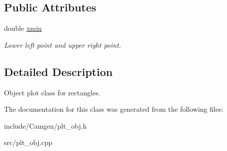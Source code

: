 \subsection*{Public Attributes}
\begin{DoxyCompactItemize}
\item 
\hypertarget{a00425_a0072bf141020155ae4d9ecafb9c4864e}{double \hyperlink{a00425_a0072bf141020155ae4d9ecafb9c4864e}{xmin}}\label{a00425_a0072bf141020155ae4d9ecafb9c4864e}

\begin{DoxyCompactList}\small\item\em Lower left point and upper right point. \end{DoxyCompactList}\end{DoxyCompactItemize}


\subsection{Detailed Description}
Object plot class for rectangles. 

The documentation for this class was generated from the following files\-:\begin{DoxyCompactItemize}
\item 
include/\-Camgen/plt\-\_\-obj.\-h\item 
src/plt\-\_\-obj.\-cpp\end{DoxyCompactItemize}
